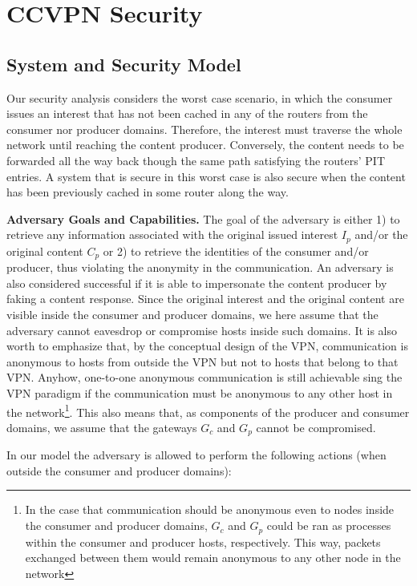 \section{CCVPN Security}\label{sec:sec-analysis}


\subsection{System and Security Model}

Our security analysis considers the worst case scenario, in which the consumer issues an interest that has not been cached in any of the routers from the consumer nor producer domains. Therefore, the interest must traverse the whole network until reaching the content producer. Conversely, the content needs to be forwarded all the way back though the same path satisfying the routers' PIT entries. A system that is secure in this worst case is also secure when the content has been previously cached in some router along the way.

\textbf{Adversary Goals and Capabilities.} The goal of the adversary is either 1) to retrieve any information associated with the original issued interest $I_p$ and/or the original content $C_p$ or 2) to retrieve the identities of the consumer and/or producer, thus violating the anonymity in the communication. An adversary is also considered successful if it is able to impersonate the content producer by faking a content response. Since the original interest and the original content are visible inside the consumer and producer domains, we here assume that the adversary cannot eavesdrop or compromise hosts inside such domains. It is also worth to emphasize that, by the conceptual design of the VPN, communication is anonymous to hosts from outside the VPN but not to hosts that belong to that VPN. Anyhow, one-to-one anonymous communication is still achievable sing the VPN paradigm if the communication must be anonymous to any other host in the network\footnote{In the case that communication should be anonymous even to nodes inside the consumer and producer domains, $G_c$ and $G_p$ could be ran as processes within the consumer and producer hosts, respectively. This way, packets exchanged between them would remain anonymous to any other node in the network}. This also means that, as components of the producer and consumer domains, we assume that the gateways $G_c$ and $G_p$ cannot be compromised.

In our model the adversary is allowed to perform the following actions (when outside the consumer and producer domains):

